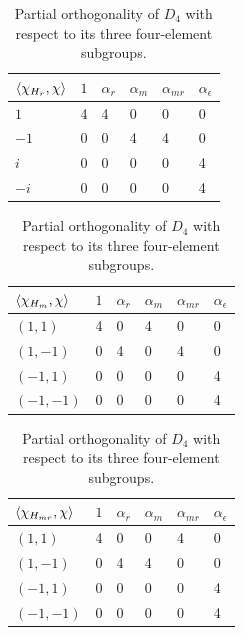 \documentclass[two column]{article}
\begin{document}
\begin{table}[h]
\centering
\begin{tabular}{l|lllll}
  $\braket{\chi_{H_r}, \chi}$ & $1$ & $\alpha_{r}$ & $\alpha_{m}$ & $\alpha_{mr}$ & $\alpha_{\epsilon}$ \\ \hline
$1$ & 4   & 4            & 0             & 0               & 0                   \\ 
$-1$ & 0   & 0            & 4             & 4               & 0                   \\ 
$i$ & 0   & 0            & 0             & 0               & 4                   \\ 
$-i$ & 0   & 0            & 0             & 0               & 4                   \\ 
\end{tabular}

\begin{tabular}{l|lllll}
  $\braket{\chi_{H_m}, \chi}$ & $1$ & $\alpha_{r}$ & $\alpha_{m}$ & $\alpha_{mr}$ & $\alpha_{\epsilon}$ \\ \hline
$(1,1)$ & 4   & 0            & 4             & 0               & 0                   \\ 
$ (1,-1)$ & 0   & 4            & 0             & 4               & 0                   \\ 
$(-1,1)$ & 0   & 0            & 0             & 0               & 4                   \\ 
$(-1,-1)$ & 0   & 0            & 0             & 0               & 4                   \\ 
\end{tabular}
\begin{tabular}{l|lllll}
  $\braket{\chi_{H_{mr}}, \chi}$ & $1$ & $\alpha_{r}$ & $\alpha_{m}$ & $\alpha_{mr}$ & $\alpha_{\epsilon}$ \\ \hline
$(1,1)$ & 4   & 0            & 0             & 4               & 0                   \\ 
$ (1,-1)$ & 0   & 4            & 4             & 0               & 0                   \\ 
$(-1,1)$ & 0   & 0            & 0             & 0               & 4                   \\ 
$(-1,-1)$ & 0   & 0            & 0             & 0               & 4                   \\ 
\end{tabular}
\caption{Partial orthogonality of $D_4$ with respect to its three four-element subgroups.}
\label{tab:red_ch}
\end{table}
\end{document}
